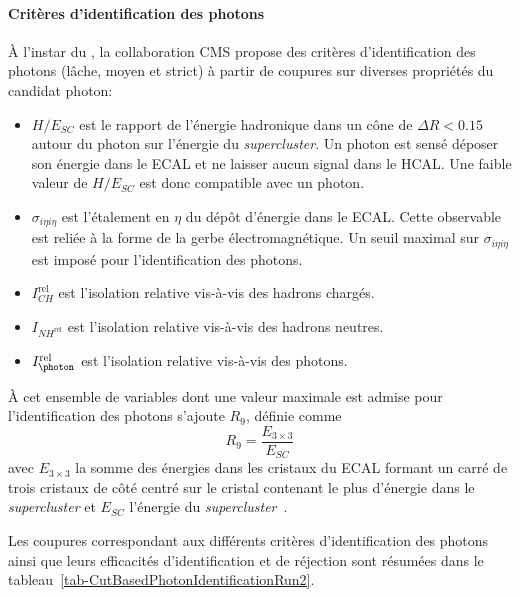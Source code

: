 \paragraph{Critères d'identification des photons}
À l'instar du \CutBasedEleID,
la collaboration CMS propose des critères d'identification des photons (lâche, moyen et strict) à partir de coupures sur diverses propriétés du \og candidat \fg{} photon:
\begin{itemize}
\item $H/E_{SC}$ est le rapport de l'énergie hadronique dans un cône de $\Delta R < \num{0.15}$ autour du photon sur l'énergie du \emph{supercluster}.
Un photon est sensé déposer son énergie dans le ECAL et ne laisser aucun signal dans le HCAL.
Une faible valeur de $H/E_{SC}$ est donc compatible avec un photon.
\item $\sigma_{i\eta i\eta}$ est l'étalement en $\eta$ du dépôt d'énergie dans le ECAL.
Cette observable est reliée à la forme de la gerbe électromagnétique.
Un seuil maximal sur $\sigma_{i\eta i\eta}$ est imposé pour l'identification des photons.
\item $I_{CH}^\text{rel}$ est l'isolation relative vis-à-vis des hadrons chargés.
\item $I_{NH^\text{rel}}$ est l'isolation relative vis-à-vis des hadrons neutres.
\item $I_{\photon}^\text{rel}$ est l'isolation relative vis-à-vis des photons.
\end{itemize}
À cet ensemble de variables dont une valeur maximale est admise pour l'identification des photons s'ajoute $R_9$, définie comme
\begin{equation}
R_9 = \frac{E_{3\times3}}{E_{SC}}
\label{eq-R9_definition}
\end{equation}
avec
$E_{3\times3}$ la somme des énergies dans les cristaux du ECAL formant un carré de trois cristaux de côté centré sur le cristal contenant le plus d'énergie dans le \emph{supercluster}
et
$E_{SC}$
l'énergie du \emph{supercluster}~\cite{photon_ID_2015}.
\par 
Les coupures correspondant aux différents critères d'identification des photons ainsi que leurs efficacités d'identification et de réjection sont résumées dans le tableau~\ref{tab-CutBasedPhotonIdentificationRun2}.
